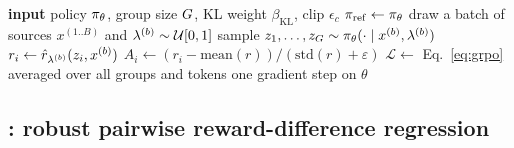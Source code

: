 \begin{algorithm}[t]
\caption{GRPO as implemented (one update per rollout, pinned KL anchor)}
\label{alg:grpo}
\begin{algorithmic}[1]
\STATE \textbf{input} policy $\pi_\theta$, group size $G$, KL weight $\beta_{\mathrm{KL}}$, clip $\epsilon_c$
\STATE $\pi_{\mathrm{ref}} \leftarrow \pi_\theta$ 
  \STATE draw a batch of sources $x^{(1..B)}$ and $\lambda^{(b)} \sim \mathcal{U}[0,1]$
    \STATE sample $z_1,\dots,z_G \sim \pi_\theta(\cdot \mid x^{(b)}, \lambda^{(b)})$
    \STATE $r_i \leftarrow \hat{r}_{\lambda^{(b)}}(z_i, x^{(b)})$ 
    \STATE $A_i \leftarrow (r_i - \mathrm{mean}(r))/(\mathrm{std}(r) + \varepsilon)$
  \ENDFOR
  \STATE $\mathcal{L} \leftarrow$ Eq.~\eqref{eq:grpo} averaged over all groups and tokens
  \STATE one gradient step on $\theta$ 
\ENDFOR
\end{algorithmic}
\end{algorithm}

\subsection{\rrebel{}: robust pairwise reward-difference regression}
\label{sec:rrebel}

